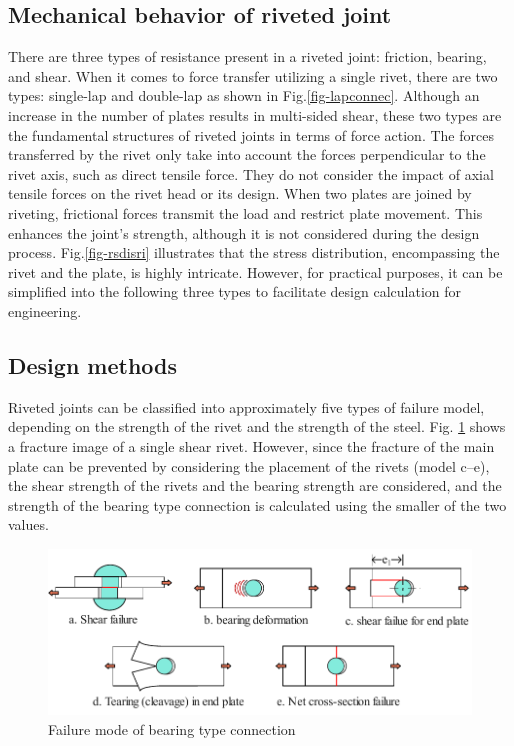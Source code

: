 \subsection{Mechanical behavior of riveted joint}

There are three types of resistance present in a riveted joint: friction, bearing, and shear. When it comes to force transfer utilizing a single rivet, there are two types: single-lap and double-lap as shown in Fig.\ref{fig-lapconnec}. Although an increase in the number of plates results in multi-sided shear, these two types are the fundamental structures of riveted joints in terms of force action. The forces transferred by the rivet only take into account the forces perpendicular to the rivet axis, such as direct tensile force. They do not consider the impact of axial tensile forces on the rivet head or its design. When two plates are joined by riveting, frictional forces transmit the load and restrict plate movement. This enhances the joint's strength, although it is not considered during the design process. Fig.\ref{fig-rsdisri} illustrates that the stress distribution, encompassing the rivet and the plate, is highly intricate. However, for practical purposes, it can be simplified into the following three types to facilitate design calculation for engineering.

\subsection{Design methods}

Riveted joints can be classified into approximately five types of failure model, depending on the strength of the rivet and the strength of the steel. Fig. \ref{fig-beafalmode} shows a fracture image of a single shear rivet. However, since the fracture of the main plate can be prevented by considering the placement of the rivets (model c--e), the shear strength of the rivets and the bearing strength are considered, and the strength of the bearing type connection is calculated using the smaller of the two values. 

\begin{figure}
    \centering
    \includegraphics{imgs/ch2/failure-mode-bea.pdf}
    \caption{Failure mode of bearing type connection}
    \label{fig-beafalmode}
\end{figure}

